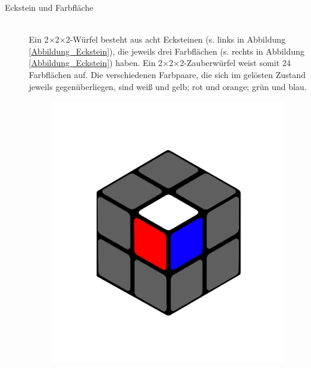 \documentclass[12pt,a4paper, usenames, dvipsnames]{article}
\theoremstyle{mystyle}
\theoremstyle{definition}
\newcommand{\Ttwo}{2$\times$2$\times$2-}
\begin{document}
\begin{description}
\item[Eckstein und Farbfläche] \ \\
Ein \Ttwo Würfel besteht aus acht Ecksteinen (s. links in Abbildung \ref{Abbildung_Eckstein}), die jeweils drei Farbflächen (s. rechts in Abbildung \ref{Abbildung_Eckstein}) haben. Ein \Ttwo Zauberwürfel weist somit 24 Farbflächen auf. Die verschiedenen Farbpaare, die sich im gelösten Zustand jeweils gegenüberliegen, sind weiß und gelb; rot und orange; grün und blau.
\begin{figure}[h]
\centering
\includegraphics[scale=0.1]{2x2stein.png}

\end{figure}
\end{description}
\end{document}
